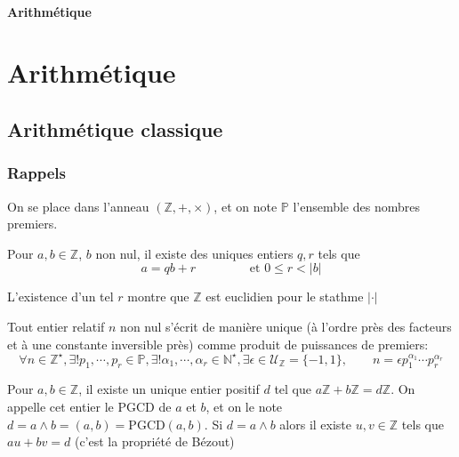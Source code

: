 \ifsolo
    ~

    \vspace{1cm}

    \begin{center}
        \textbf{\LARGE Arithmétique} \\[1em]
    \end{center}
    \tableofcontents
\else
    \chapter{Arithmétique}

    \minitoc
\fi
\thispagestyle{empty}

\ifsolo \newpage \setcounter{page}{1} \fi
\section{Arithmétique classique}

\subsection{Rappels}

On se place dans l'anneau $(\mathbb Z, +, \times)$, et on note $\mathbb P$ l'ensemble des nombres premiers.

\begin{thm}
     Pour $a, b\in\mathbb Z$, $b$ non nul, il existe des uniques entiers $q, r$ tels que \[
        a=qb+r\qquad \qquad \text{ et } 0\leq r<|b|
    \]
\end{thm}

\begin{rem}
    L'existence d'un tel $r$ montre que $\mathbb Z$ est euclidien pour le stathme $|\cdot|$
\end{rem}

\begin{thm}
    Tout entier relatif $n$ non nul s'écrit de manière unique (à l'ordre près des facteurs et à une constante inversible près) comme produit de puissances de premiers: \[
        \forall n\in\mathbb Z^\star, \exists! p_1, \cdots, p_r\in\mathbb P, \exists! \alpha_1, \cdots, \alpha_r\in\mathbb N^\star, \exists \epsilon\in\mathcal U_{\mathbb Z}=\{-1, 1\}, \qquad n=\epsilon p_1^{\alpha_1}\cdots p_r^{\alpha_r}
    \]
\end{thm}

\begin{thmdef}
    Pour $a, b\in\mathbb Z$, il existe un unique entier positif $d$ tel que $a\mathbb Z+b\mathbb Z=d\mathbb Z$. On appelle cet entier le PGCD de $a$ et $b$, et on le note $d=a\land b=(a, b)=\mathrm{PGCD}(a, b)$. Si $d=a\land b$ alors il existe $u, v\in \mathbb Z$ tels que $au+bv=d$ (c'est la  propriété de Bézout)
\end{thmdef}

